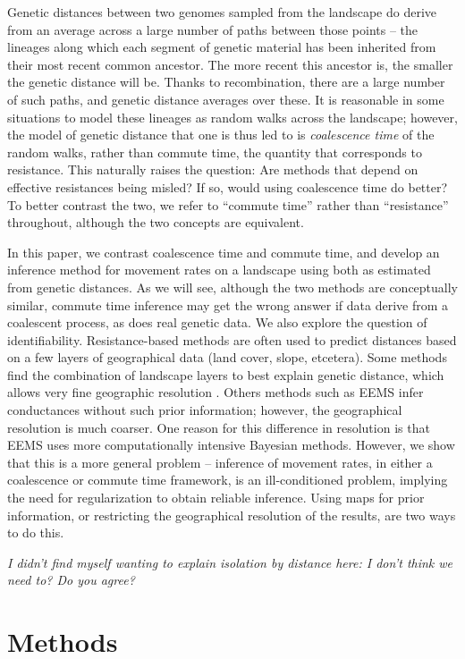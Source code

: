\documentclass{article}
\newcommand{\plr}[1]{{\em \color{blue} #1}}
\begin{document}
Genetic distances between two genomes sampled from the landscape
do derive from an average across a large number of paths between those points --
the lineages along which each segment of genetic material has been inherited
from their most recent common ancestor.
The more recent this ancestor is,
the smaller the genetic distance will be.
Thanks to recombination, there are a large number of such paths, 
and genetic distance averages over these.
It is reasonable in some situations to model these lineages as random walks across the landscape;
however, the model of genetic distance that one is thus led to
is \emph{coalescence time} of the random walks, 
rather than commute time, the quantity that corresponds to resistance.
This naturally raises the question: 
Are methods that depend on effective resistances being misled?
If so, would using coalescence time do better?
To better contrast the two,
we refer to ``commute time'' rather than ``resistance'' throughout,
although the two concepts are equivalent.

In this paper, we contrast 
coalescence time and commute time,
and develop an inference method for movement rates on a landscape
using both as estimated from genetic distances.
As we will see,
although the two methods are conceptually similar,
commute time inference may get the wrong answer if data derive from a coalescent process,
as does real genetic data.
We also explore the question of identifiability.
Resistance-based methods are often used to predict distances based on a few layers of geographical data
(land cover, slope, etcetera).
Some methods find the combination of landscape layers to best explain genetic distance,
which allows very fine geographic resolution \citep{infer_resistance}.
Others methods such as EEMS \citep{eems} infer conductances without such prior information;
however, the geographical resolution is much coarser.
One reason for this difference in resolution
is that EEMS uses more computationally intensive Bayesian methods.
However, we show that this is a more general problem --
inference of movement rates, in either a coalescence or commute time framework,
is an ill-conditioned problem,
implying the need for regularization to obtain reliable inference.
Using maps for prior information, or restricting the geographical resolution of the results,
are two ways to do this.

\plr{I didn't find myself wanting to explain isolation by distance here:
    I don't think we need to? Do you agree?}

\section*{Methods}
\end{document}
